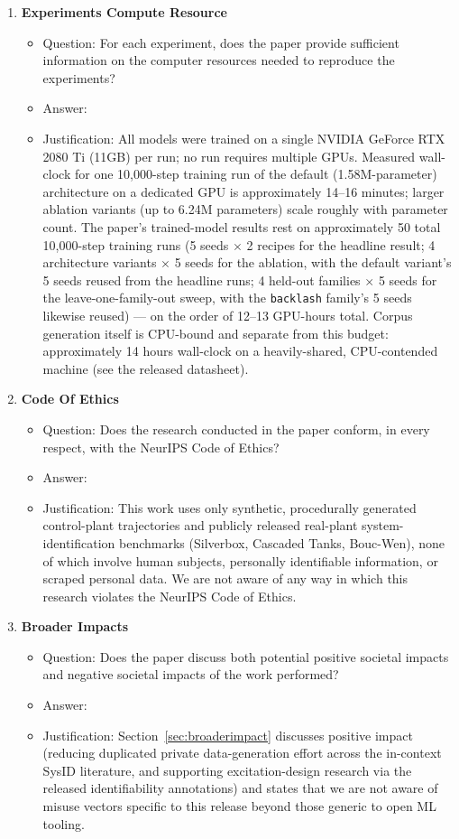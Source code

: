 \documentclass{article}
\begin{document}
\begin{enumerate}
\item {\bf Experiments Compute Resource}
  \begin{itemize}
    \item Question: For each experiment, does the paper provide sufficient information on the computer resources needed to reproduce the experiments?
    \item Answer: \answerYes{}
    \item Justification: All models were trained on a single NVIDIA GeForce RTX 2080 Ti (11GB) per run; no run requires multiple GPUs. Measured wall-clock for one 10{,}000-step training run of the default (1.58M-parameter) architecture on a dedicated GPU is approximately 14--16 minutes; larger ablation variants (up to 6.24M parameters) scale roughly with parameter count. The paper's trained-model results rest on approximately 50 total 10{,}000-step training runs (5 seeds $\times$ 2 recipes for the headline result; 4 architecture variants $\times$ 5 seeds for the ablation, with the default variant's 5 seeds reused from the headline runs; 4 held-out families $\times$ 5 seeds for the leave-one-family-out sweep, with the \texttt{backlash} family's 5 seeds likewise reused) --- on the order of 12--13 GPU-hours total. Corpus generation itself is CPU-bound and separate from this budget: approximately 14 hours wall-clock on a heavily-shared, CPU-contended machine (see the released datasheet).
  \end{itemize}

\item {\bf Code Of Ethics}
  \begin{itemize}
    \item Question: Does the research conducted in the paper conform, in every respect, with the NeurIPS Code of Ethics?
    \item Answer: \answerYes{}
    \item Justification: This work uses only synthetic, procedurally generated control-plant trajectories and publicly released real-plant system-identification benchmarks (Silverbox, Cascaded Tanks, Bouc-Wen), none of which involve human subjects, personally identifiable information, or scraped personal data. We are not aware of any way in which this research violates the NeurIPS Code of Ethics.
  \end{itemize}

\item {\bf Broader Impacts}
  \begin{itemize}
    \item Question: Does the paper discuss both potential positive societal impacts and negative societal impacts of the work performed?
    \item Answer: \answerYes{}
    \item Justification: Section~\ref{sec:broaderimpact} discusses positive impact (reducing duplicated private data-generation effort across the in-context SysID literature, and supporting excitation-design research via the released identifiability annotations) and states that we are not aware of misuse vectors specific to this release beyond those generic to open ML tooling.
  \end{itemize}


\end{enumerate}
\end{document}
